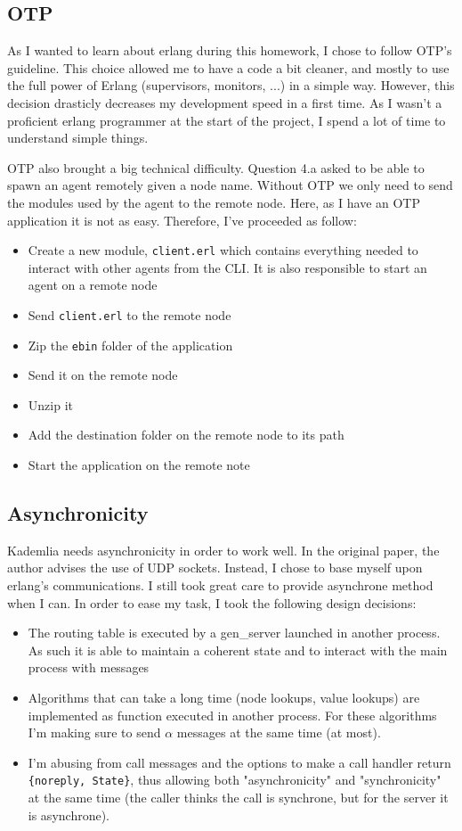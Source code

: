 \documentclass[a4paper]{article}
\begin{document}
\subsection{OTP}

As I wanted to learn about erlang during this homework, I chose to follow OTP's guideline. This choice allowed me to have a code a bit cleaner, and mostly to use the full power of Erlang (supervisors, monitors, ...) in a simple way.
However, this decision drasticly decreases my development speed in a first time. As I wasn't a proficient erlang programmer at the start of the project, I spend a lot of time to understand simple things.

OTP also brought a big technical difficulty. Question 4.a asked to be able to spawn an agent remotely given a node name. Without OTP we only need to send the modules used by the agent to the remote node. Here, as I have an OTP application it is not as easy. Therefore, I've proceeded as follow:
\begin{itemize}
    \item Create a new module, \verb|client.erl| which contains everything needed to interact with other agents from the CLI. It is also responsible to start an agent on a remote node
    \item Send \verb|client.erl| to the remote node
    \item Zip the \verb|ebin| folder of the application
    \item Send it on the remote node
    \item Unzip it
    \item Add the destination folder on the remote node to its path
    \item Start the application on the remote note
\end{itemize}

\subsection{Asynchronicity}

Kademlia needs asynchronicity in order to work well. In the original paper, the author advises the use of UDP sockets. Instead, I chose to base myself upon erlang's communications. I still took great care to provide asynchrone method when I can. 
In order to ease my task, I took the following design decisions:
\begin{itemize}
    \item The routing table is executed by a gen\_server launched in another process. As such it is able to maintain a coherent state and to interact with the main process with messages
    \item Algorithms that can take a long time (node lookups, value lookups) are implemented as function executed in another process. For these algorithms I'm making sure to send $\alpha$ messages at the same time (at most).
    \item I'm abusing from call messages and the options to make a call handler return \verb|{noreply, State}|, thus allowing both "asynchronicity" and "synchronicity" at the same time (the caller thinks the call is synchrone, but for the server it is asynchrone).
\end{itemize}
\end{document}
